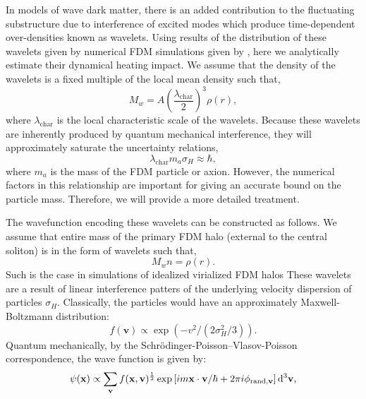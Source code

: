 \documentclass[usenatbib]{mnras}
\begin{document}
In models of wave dark matter, there is an added contribution to the fluctuating substructure due to interference of excited modes which produce time-dependent over-densities known as wavelets. Using results of the distribution of these wavelets given by numerical FDM simulations given by \cite{BECDM}, here we analytically estimate their dynamical heating impact. We assume that the density of the wavelets is a fixed multiple of the local mean density such that,
\begin{equation} \label{multiple_of_background}
M_w = A \left(\frac{\lambda_{\text{char}}}{2} \right)^3 \rho(r),
\end{equation}  
where $\lambda_{\text{char}}$ is the local characteristic scale of the wavelets. Because these wavelets are inherently produced by quantum mechanical interference, they will approximately saturate the uncertainty relations,
\begin{equation}
\lambda_{\text{char}} m_a \sigma_H \approx \hbar,
\end{equation}
where $m_a$ is the mass of the FDM particle or axion. However, the numerical factors in this relationship are important for giving an accurate bound on the particle mass. Therefore, we will provide a more detailed treatment. 
\par
The wavefunction encoding these wavelets can be constructed as follows. We assume that entire mass of the primary FDM halo (external to the central soliton) is in the form of wavelets such that,
\begin{equation} \label{const}
M_w n = \rho(r).
\end{equation}
Such is the case in simulations of idealized virialized FDM halos \citep{numerical-Schrodinger} These wavelets are a result of linear interference patters of the underlying velocity dispersion of particles $\sigma_H$. Classically, the particles would have an approximately Maxwell-Boltzmann distribution:
\begin{equation}
f(\mathbf{v}) \propto \exp\left(-v^2/(2\sigma_{H}^2/3)\right).
\end{equation}
Quantum mechanically, by the Schr\"{o}dinger-Poisson–Vlasov-Poisson correspondence, the wave function is given by:
\begin{equation} \label{phase_dist}
\psi(\mathbf{x}) \propto \sum_{\mathbf{v}} f(\mathbf{x},\mathbf{v})^{\frac{1}{2}} \exp{\left[i m \mathbf{x}\cdot\mathbf{v}/\hbar + 2\pi i \phi_{{\rm rand},\mathbf{v}} \right]}
\, \mathrm{d}^{3}{\mathbf{v}},
\end{equation}
\end{document}
